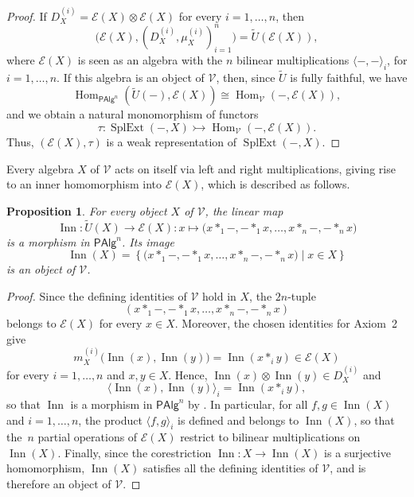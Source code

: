\documentclass[reqno,a4paper]{amsart}
\theoremstyle{plain}
\newtheorem{proposition}[subsection]{Proposition}
\theoremstyle{definition}
\theoremstyle{remark}
\numberwithin{equation}{section}
\newcommand{\E}{\mathcal{E}}
\newcommand{\V}{\mathcal{V}}
\DeclareMathOperator{\Hom}{Hom}
\DeclareMathOperator{\SplExt}{SplExt}
\DeclareMathOperator{\Inn}{Inn}
\newcommand{\PAlg}{\ensuremath{\mathsf{PAlg}}}
\begin{document}
\begin{proof}
If $D_X^{(i)}=\E(X)\otimes\E(X)$ for every $i=1,\ldots,n$, then
\[
\bigl(\E(X),(D_X^{(i)},\mu_X^{(i)})_{i=1}^n\bigr)=\widetilde U(\E(X)),
\]
where $\E(X)$ is seen as an algebra with the $n$ bilinear multiplications $\langle-,-\rangle_i$, for $i=1,\ldots,n$. If this algebra is an object of $\V$, then, since $\widetilde U$ is fully faithful, we have
\[
\Hom_{\PAlg^n}(\widetilde U(-),\E(X))\cong\Hom_\V(-,\E(X)),
\]
and we obtain a natural monomorphism of functors
\[
\tau\colon
\SplExt(-,X)
\rightarrowtail
\Hom_\V(-,\E(X)).
\]
Thus, $(\E(X),\tau)$ is a weak representation of $\SplExt(-,X)$.
\end{proof}

Every algebra $X$ of $\V$ acts on itself via left and right multiplications, giving rise to an inner homomorphism into $\E(X)$, which is described as follows.

\begin{proposition}\label{InnerMultipliersN}
For every object $X$ of $\V$, the linear map
\[
\operatorname{Inn}\colon \widetilde U(X)\to\E(X)\colon
x\mapsto
\bigl(
x\ast_1-,-\ast_1x,\ldots,
x\ast_n-,-\ast_nx
\bigr)
\]
is a morphism in $\PAlg^n$. Its image
\[
\Inn(X)=
\left\{
\bigl(
x\ast_1-,-\ast_1x,\ldots,
x\ast_n-,-\ast_nx
\bigr)
\mid 
x\in X
\right\}
\]
is an object of $\V$.
\end{proposition}

\begin{proof}
Since the defining identities of $\V$ hold in $X$, the $2n$-tuple
\[
(x\ast_1-,-\ast_1 x,\ldots,x\ast_n-,-\ast_n x)
\]
belongs to $\E(X)$ for every $x\in X$. Moreover, the chosen identities for Axiom~2 give
\[
m_X^{(i)}\bigl(
\operatorname{Inn}(x),
\operatorname{Inn}(y)
\bigr)
=
\operatorname{Inn}(x\ast_i y)\in\E(X)
\]
for every $i=1,\ldots,n$ and $x,y\in X$. Hence, $\operatorname{Inn}(x)\otimes\operatorname{Inn}(y)\in D_X^{(i)}$ and
\[
\langle\operatorname{Inn}(x),\operatorname{Inn}(y)\rangle_i=\operatorname{Inn}(x\ast_iy),
\]
so that $\operatorname{Inn}$ is a morphism in $\PAlg^n$ by . In particular, for all $f,g\in\Inn(X)$ and $i=1,\ldots,n$, the product $\langle f,g\rangle_i$ is defined and belongs to $\Inn(X)$, so that the~$n$ partial operations of $\E(X)$ restrict to bilinear multiplications on $\Inn(X)$. Finally, since the corestriction $\operatorname{Inn} \colon X \to \Inn(X)$ is a surjective homomorphism, $\Inn(X)$ satisfies all the defining identities of $\V$, and is therefore an object of $\V$.
\end{proof}
\end{document}
